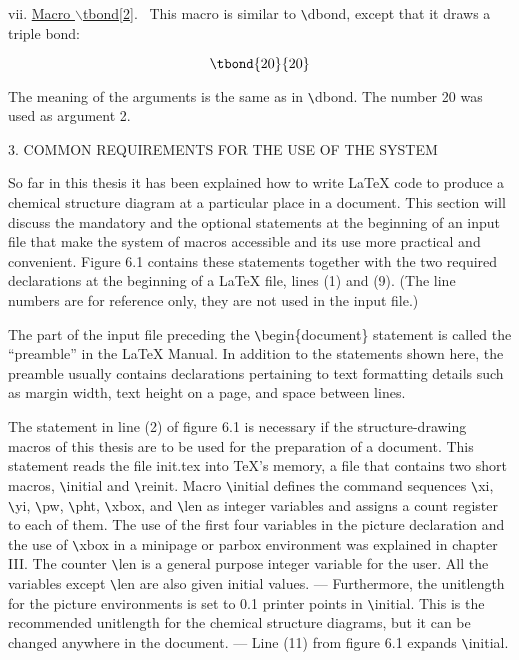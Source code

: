  \vspace{\len mm}
 \indent vii. \underline{Macro $\backslash $tbond[2]}.
 \ This macro is similar to \verb+\+dbond, except that it
 draws a triple bond:

 \[ \tbond{20}{20}  \]

 The meaning of the arguments is the same as in 
 \verb+\+dbond. The number 20 was used as argument 2.
 \vspace{\len mm}
  

 \centerline{3. COMMON REQUIREMENTS FOR THE USE OF THE SYSTEM}
 \vspace{\len mm}
 So far in this thesis it has been explained how to write
 LaTeX code to produce a chemical structure diagram at a
 particular place in a document. This section will discuss the
 mandatory and the optional statements at the beginning of an
 input file that make the system of macros accessible and
 its use more practical and convenient. Figure 6.1 contains
 these statements together with the two required declarations
 at the beginning of a LaTeX file, lines (1) and (9).
 (The line numbers are for reference only, they are not used
 in the input file.)

 The part of the input file preceding the \verb+\+begin\{document\}
 statement is called the ``preamble'' in the LaTeX Manual.
 In addition to the statements shown here, the preamble usually
 contains declarations pertaining to text formatting details
 such as margin width, text height on a page, and space between
 lines. 

 The statement in line (2) of figure 6.1 is necessary if the
 structure-drawing macros of this thesis are to be used for
 the preparation of a document. This statement reads the file
 init.tex into TeX's memory, a file that contains two short
 macros, \verb+\+initial and \verb+\+reinit. Macro \verb+\+initial
 defines the command sequences \verb+\+xi, \verb+\+yi, \verb+\+pw,
 \verb+\+pht, \verb+\+xbox, and \verb+\+len  as integer variables
 and assigns a count register to each of them.  The use of the
 first four variables in the picture declaration and the use
 of \verb+\+xbox in a minipage or parbox environment was
 explained in chapter III. The counter \verb+\+len is a general
 purpose integer variable for the user. All the variables
 except \verb+\+len are also given initial values. ---
 Furthermore, the unitlength for the picture environments is
 set to 0.1 printer points in \verb+\+initial. This is the
 recommended unitlength for the chemical structure diagrams,
 but it can be changed anywhere in the document. ---
 Line (11) from figure 6.1 expands \verb+\+initial. 


